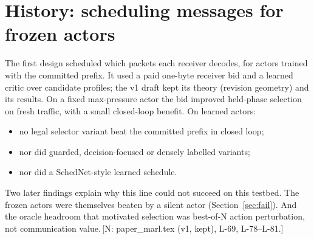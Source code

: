 \documentclass[11pt]{article}
\theoremstyle{definition}
\newif\ifshownotes\shownotestrue
\newcommand{\NOTE}[1]{\ifshownotes{\color{notecol}\,\textsf{\footnotesize[N: #1]}}\fi}
\begin{document}
\appendix
\section{History: scheduling messages for frozen actors}\label{app:history}
The first design scheduled which packets each receiver decodes, for actors trained with the committed prefix. It used a
paid one-byte receiver bid and a learned critic over candidate profiles; the v1 draft kept its theory (revision
geometry) and its results. On a fixed max-pressure actor the bid improved held-phase selection on fresh traffic, with a
small closed-loop benefit. On learned actors:
\begin{itemize}
\item no legal selector variant beat the committed prefix in closed loop;
\item nor did guarded, decision-focused or densely labelled variants;
\item nor did a SchedNet-style learned schedule.
\end{itemize}
Two later findings explain why this line could not succeed on this testbed. The frozen actors were themselves beaten by
a silent actor (Section~\ref{sec:fail}). And the oracle headroom that motivated selection was best-of-N action
perturbation, not communication value.\NOTE{paper\_marl.tex (v1, kept), L-69, L-78--L-81.}
\end{document}
